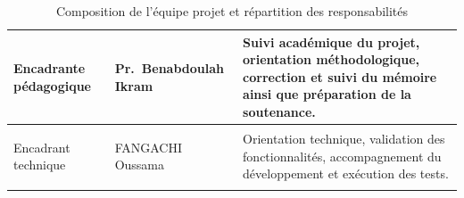 \begin{table}[H]
\begin{tabularx}{\textwidth}{
    >{\bfseries\raggedright\arraybackslash}p{3.3cm}
    >{\raggedright\arraybackslash}p{4.0cm}
    >{\raggedright\arraybackslash}X
}
\midrule

Encadrante pédagogique
&
Pr.~Benabdoulah Ikram
&
Suivi académique du projet, orientation méthodologique,
correction et suivi du mémoire ainsi que préparation de la soutenance.
\\

\midrule

Encadrant technique
&
FANGACHI Oussama
&
Orientation technique, validation des fonctionnalités,
accompagnement du développement et exécution des tests.
\\

\bottomrule
\end{tabularx}

\caption{Composition de l'équipe projet et répartition des responsabilités}
\label{tab:equipe}
\end{table}



